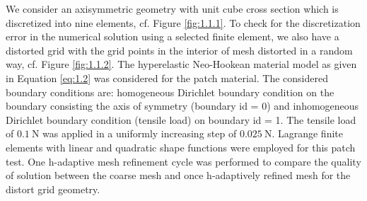\documentclass[11pt,a4paper,final]{article}
\begin{document}
We consider an axisymmetric geometry with unit cube cross section which is discretized into nine elements, cf. Figure \eqref{fig:1.1.1}. To check for the discretization error in the numerical solution using a selected finite element, we also have a distorted grid with the grid points in the interior of mesh distorted in a random way, cf. Figure \eqref{fig:1.1.2}. The hyperelastic Neo-Hookean material model as given in Equation \eqref{eq:1.2} was considered for the patch material. The considered boundary conditions are: homogeneous Dirichlet boundary condition on the boundary consisting the axis of symmetry (boundary id = 0) and inhomogeneous Dirichlet boundary condition (tensile load) on boundary id = 1. The tensile load of $0.1 \ \text{N}$ was applied in a uniformly increasing step of $0.025 \ \text{N}$. Lagrange finite elements with linear and quadratic shape functions were employed for this patch test. One h-adaptive mesh refinement cycle was performed to compare the quality of solution between the coarse mesh and once h-adaptively refined mesh for the distort grid geometry. \par 
\end{document}
